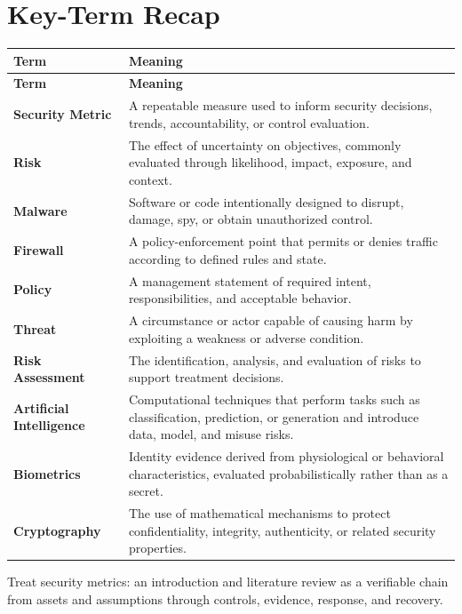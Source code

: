 \documentclass[11pt]{article}
\begin{document}
\section*{Key-Term Recap}
\begin{longtable}{>{\RaggedRight\arraybackslash}p{}>{\RaggedRight\arraybackslash}p{}}
\toprule\rowcolor{Navy}\color{white}\textbf{Term} & \color{white}\textbf{Meaning}\\\midrule
\endfirsthead
\toprule\rowcolor{Navy}\color{white}\textbf{Term} & \color{white}\textbf{Meaning}\\\midrule
\endhead
\textbf{Security Metric} & A repeatable measure used to inform security decisions, trends, accountability, or control evaluation. \\\midrule
\textbf{Risk} & The effect of uncertainty on objectives, commonly evaluated through likelihood, impact, exposure, and context. \\\midrule
\textbf{Malware} & Software or code intentionally designed to disrupt, damage, spy, or obtain unauthorized control. \\\midrule
\textbf{Firewall} & A policy-enforcement point that permits or denies traffic according to defined rules and state. \\\midrule
\textbf{Policy} & A management statement of required intent, responsibilities, and acceptable behavior. \\\midrule
\textbf{Threat} & A circumstance or actor capable of causing harm by exploiting a weakness or adverse condition. \\\midrule
\textbf{Risk Assessment} & The identification, analysis, and evaluation of risks to support treatment decisions. \\\midrule
\textbf{Artificial Intelligence} & Computational techniques that perform tasks such as classification, prediction, or generation and introduce data, model, and misuse risks. \\\midrule
\textbf{Biometrics} & Identity evidence derived from physiological or behavioral characteristics, evaluated probabilistically rather than as a secret. \\\midrule
\textbf{Cryptography} & The use of mathematical mechanisms to protect confidentiality, integrity, authenticity, or related security properties. \\\midrule
\bottomrule
\end{longtable}
\begin{takeawaybox}
Treat security metrics: an introduction and literature review as a verifiable chain from assets and assumptions through controls, evidence, response, and recovery.
\end{takeawaybox}
\end{document}
